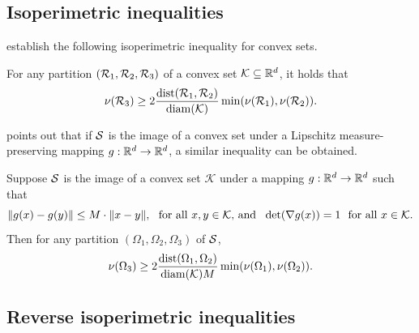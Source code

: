 \subsection{Isoperimetric inequalities}
\label{subsec:isoperimetric_inequalities}
\citet{dyer1991} establish the following isoperimetric inequality for convex sets.
\begin{lemma}
	\label{lem:convex_isoperimetric_inequality}
	For any partition $(\mathcal{R}_1,\mathcal{R}_2,\mathcal{R}_3)$ of a convex set $\mathcal{K} \subseteq \mathbb{R}^d$, it holds that
	\begin{equation*}
	\nu(\mathcal{R}_3) \geq 2\frac{\mathrm{dist}(\mathcal{R}_1, \mathcal{R}_2)}{\mathrm{diam}(\mathcal{K})} \min(\nu(\mathcal{R}_1), \nu(\mathcal{R}_2)).
	\end{equation*}
\end{lemma}
\citet{abbasi-yadkori2016a} points out that if $\mathcal{S}$ is the image of a convex set under a Lipschitz measure-preserving mapping $g: \mathbb{R}^d \to \mathbb{R}^d$, a similar inequality can be obtained.
\begin{corollary}
	\label{cor:nonconvex_isoperimetric_inequality}
	Suppose $\mathcal{S}$ is the image of a convex set $\mathcal{K}$ under a mapping $g:\mathbb{R}^d \to \mathbb{R}^d$ such that
	\begin{equation*}
	\|g(x) - g(y)\| \leq M \cdot \|x - y\|,~~\textrm{for all $x,y \in \mathcal{K}$, and}~~\det(\nabla g(x)) = 1~~\textrm{for all $x \in \mathcal{K}$.}
	\end{equation*}
	Then for any partition $(\Omega_1,\Omega_2,\Omega_3)$ of $\mathcal{S}$, 
	\begin{equation*}
	\nu(\Omega_3) \geq 2\frac{\mathrm{dist}(\Omega_1, \Omega_2)}{\mathrm{diam}(\mathcal{K}) M} \min(\nu(\Omega_1), \nu(\Omega_2)).
	\end{equation*}
\end{corollary}

\subsection{Reverse isoperimetric inequalities}
\label{subsec:reverse_isoperimetric_inequalities}

